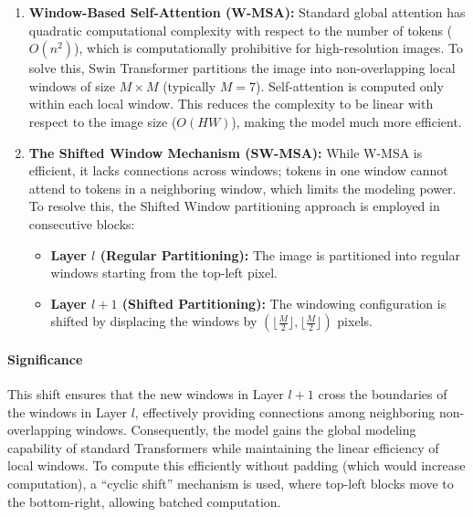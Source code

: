 \begin{enumerate}
    \item \textbf{Window-Based Self-Attention (W-MSA):} 
    Standard global attention has quadratic computational complexity with respect to the number of tokens ($O(n^2)$), which is computationally prohibitive for high-resolution images. To solve this, Swin Transformer partitions the image into non-overlapping local windows of size $M \times M$ (typically $M=7$). Self-attention is computed only within each local window. This reduces the complexity to be linear with respect to the image size ($O(HW)$), making the model much more efficient.

    \item \textbf{The Shifted Window Mechanism (SW-MSA):} 
    While W-MSA is efficient, it lacks connections across windows; tokens in one window cannot attend to tokens in a neighboring window, which limits the modeling power. To resolve this, the Shifted Window partitioning approach is employed in consecutive blocks:
    \begin{itemize}
        \item \textbf{Layer $l$ (Regular Partitioning):} The image is partitioned into regular windows starting from the top-left pixel.
        \item \textbf{Layer $l+1$ (Shifted Partitioning):} The windowing configuration is shifted by displacing the windows by $(\lfloor \frac{M}{2} \rfloor, \lfloor \frac{M}{2} \rfloor)$ pixels.
    \end{itemize}
\end{enumerate}

\paragraph{Significance}
This shift ensures that the new windows in Layer $l+1$ cross the boundaries of the windows in Layer $l$, effectively providing connections among neighboring non-overlapping windows. Consequently, the model gains the global modeling capability of standard Transformers while maintaining the linear efficiency of local windows. To compute this efficiently without padding (which would increase computation), a ``cyclic shift'' mechanism is used, where top-left blocks move to the bottom-right, allowing batched computation.

